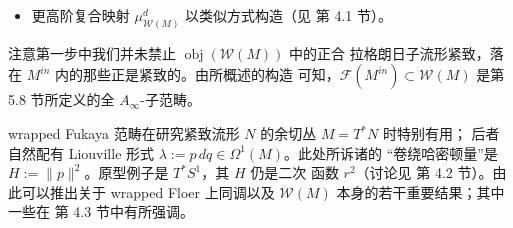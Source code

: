 \begin{itemize}
  必须要求 $1$-形式 $\beta\in\Omega^1(\mathbb D^2)$ 还满足 $d\beta\le0$；
  这可通过 Abouzaid 的重标度技巧实现（\cite{Abo10} 第 3.2 节）：对
  $\rho>1$，$\psi^\rho_Z(L_i)$ 与 $L_i\in\operatorname{obj}(\mathcal W(M))$
  正合拉格朗日同痕，且在无穷远处
  $\frac1\rho H\circ\psi^\rho_Z=\rho H$（当 $\rho=2$ 时为 $2r^2$），于是
  可定义 Floer 乘积
  \[
  \begin{aligned}
  \mu^2_{\mathcal W(M)}:\ &CW(L_1,L_2;J,H)\otimes CW(L_0,L_1;J,H)\\
  &\to CW\bigl(\psi^2_Z(L_0),\psi^2_Z(L_2);(\psi^2_Z)_*J,
  \tfrac12H\circ\psi^2_Z\bigr)\cong CW(L_0,L_2;J,H)\,.
  \end{aligned}
  \]
  它来自满足方程 \eqref{eq:6.81} 的有限能量指标 $0$
  $\tilde J$-全纯三角形计数，所用的是适当重标度的 Floer 数据
  $(\tilde J,\tilde H)\in C^\infty([0,1],\mathcal J(M,\omega))\times
  C^\infty([0,1]\times M)$：它在“输入穿孔” $z_1,z_2$ 附近（那里
  $\beta=dt$）与所选的 $(J,H)$ 相符，而在“输出穿孔” $z_0$ 附近（那里
  $\beta=2dt$）与
  $\bigl(\tfrac14H\circ\psi^2_Z,(\psi^2_Z)_*J\bigr)$ 相符。最后，我们
  还用了正合拉格朗日同痕诱导的自然同构
  $CW(L_0,L_1;J,H)\cong CW\bigl(\psi^\rho_Z(L_0),\psi^\rho_Z(L_1);
  (\psi^\rho_Z)_*J,\tfrac1\rho H\circ\psi^\rho_Z\bigr)$。
  \item 更高阶复合映射 $\mu^d_{\mathcal W(M)}$ 以类似方式构造（见
  \cite{Abo10} 第 4.1 节）。
\end{itemize}


\begin{Rem}\label{rem:6.34}
注意第一步中我们并未禁止 $\operatorname{obj}(\mathcal W(M))$ 中的正合
拉格朗日子流形紧致，落在 $M^{in}$ 内的那些正是紧致的。由所概述的构造
可知，$\mathcal F(M^{in})\subset\mathcal W(M)$ 是第 5.8 节所定义的全
$A_\infty$-子范畴。

wrapped Fukaya 范畴在研究紧致流形 $N$ 的余切丛 $M=T^*N$ 时特别有用；
后者自然配有 Liouville 形式 $\lambda:=p\,dq\in\Omega^1(M)$。此处所诉诸的
“卷绕哈密顿量”是 $H:=\|p\|^2$。原型例子是 $T^*S^1$，其 $H$ 仍是二次
函数 $r^2$（讨论见 \cite{Aur13} 第 4.2 节）。由此可以推出关于 wrapped
Floer 上同调以及 $\mathcal W(M)$ 本身的若干重要结果；其中一些在
\cite{Aur13} 第 4.3 节中有所强调。
\end{Rem}


